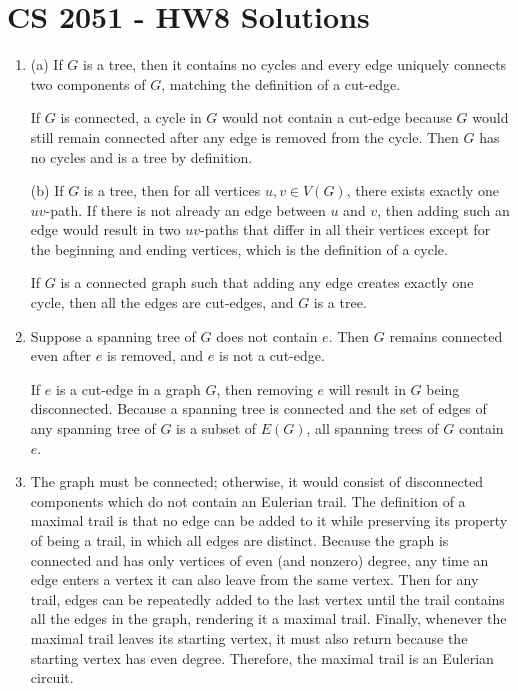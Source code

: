 \documentclass[a4paper,12pt]{article}
\begin{document}
\section*{CS 2051 - HW8 Solutions}

\begin{enumerate}
	
	\item (a) If $G$ is a tree, then it contains no cycles and every edge uniquely connects two components of $G$, matching the definition of a cut-edge. \par
	If $G$ is connected, a cycle in $G$ would not contain a cut-edge because $G$ would still remain connected after any edge is removed from the cycle. Then $G$ has no cycles and is a tree by definition. \par
	(b) If $G$ is a tree, then for all vertices $u, v \in V(G)$, there exists exactly one $uv$-path. If there is not already an edge between $u$ and $v$, then adding such an edge would result in two $uv$-paths that differ in all their vertices except for the beginning and ending vertices, which is the definition of a cycle. \par
	If $G$ is a connected graph such that adding any edge creates exactly one cycle, then all the edges are cut-edges, and $G$ is a tree.
	
	\item Suppose a spanning tree of $G$ does not contain $e$. Then $G$ remains connected even after $e$ is removed, and $e$ is not a cut-edge. \par
	If $e$ is a cut-edge in a graph $G$, then removing $e$ will result in $G$ being disconnected. Because a spanning tree is connected and the set of edges of any spanning tree of $G$ is a subset of $E(G)$, all spanning trees of $G$ contain $e$.
	
	\item The graph must be connected; otherwise, it would consist of disconnected components which do not contain an Eulerian trail. The definition of a maximal trail is that no edge can be added to it while preserving its property of being a trail, in which all edges are distinct. Because the graph is connected and has only vertices of even (and nonzero) degree, any time an edge enters a vertex it can also leave from the same vertex. Then for any trail, edges can be repeatedly added to the last vertex until the trail contains all the edges in the graph, rendering it a maximal trail. Finally, whenever the maximal trail leaves its starting vertex, it must also return because the starting vertex has even degree. Therefore, the maximal trail is an Eulerian circuit.
	

\end{enumerate}
\end{document}
